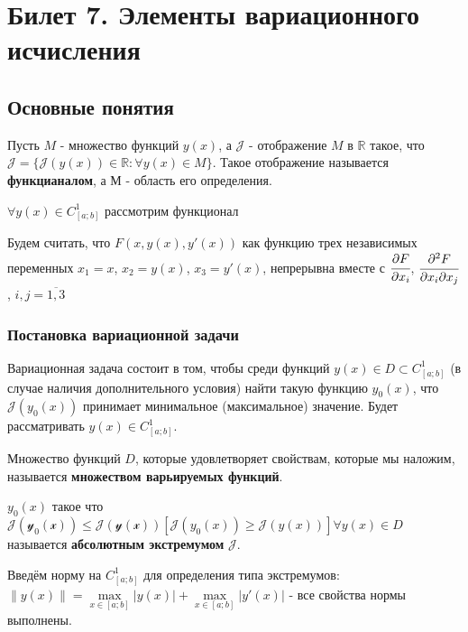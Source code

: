 \documentclass[a4paper, 12pt]{article}
\begin{document}
    \section{Билет 7. Элементы вариационного исчисления}
    \subsection{Основные понятия}
    \begin{definition}
        Пусть $M$ - множество функций $y(x)$, а $\mathcal{J}$ - отображение $M$ в $\mathbb{R}$ такое, что $\mathcal{J} = \{ \mathcal{J}(y(x)) \in \mathbb{R}: \forall y(x) \in M \}$. 
        Такое отображение называется \textbf{функцианалом}, а $М$ - область его определения. 
    \end{definition}

    $\forall y(x) \in C^1_{[a;b]}$ рассмотрим функционал 

    Будем считать, что $F(x, y(x), y'(x))$ как функцию трех независимых переменных $x_1 = x$, $x_2 = y(x)$, $x_3 = y'(x)$, непрерывна вместе с $\cfrac{\partial{F}}{\partial{x_i}}$,  $\cfrac{\partial^2{F}}{\partial{x_i}\partial{x_j}}$, $i,j = \overline{1, 3}$ 
    
    \subsubsection*{Постановка вариационной задачи}

    Вариационная задача состоит в том, чтобы среди функций $y(x) \in D \subset C^1_{[a;b]}$ (в случае наличия дополнительного условия) найти такую функцию $y_0(x)$, что $\mathcal{J}(y_0(x))$ принимает минимальное (максимальное) значение. Будет рассматривать $y(x) \in C^1_{[a;b]}$.

    \begin{definition}
        Множество функций $D$, которые удовлетворяет свойствам, которые мы наложим, называется \textbf{множеством варьируемых функций}.
    \end{definition}

    \begin{definition}
        $y_0(x)$ такое что $\mathcal{J(y_0(x))} \leq \mathcal{J(y(x))} [\mathcal{J}(y_0(x)) \geq \mathcal{J}(y(x))] \forall y(x) \in D$ называется \textbf{абсолютным экстремумом} $\mathcal{J}$.  
    \end{definition}
    
    Введём норму на $C^1_{[a;b]}$ для определения типа экстремумов: $\| y(x) \| = \max \limits_{x \in [a;b]} |y(x)| + \max \limits_{x \in [a;b]} |y'(x)|$ - все свойства нормы выполнены.
\end{document}
